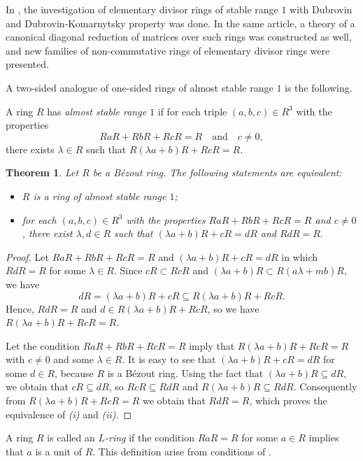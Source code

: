 \documentclass[12pt,a4paper, reqno]{amsart}
\newtheorem{theorem}{Theorem}
\begin{document}
In \cite{Bovdi_Zabavsky_2}, the investigation of elementary divisor rings of stable range $1$ with Dubrovin and
Dubrovin-Komarnytsky property was done.
In the same article, a theory of a canonical diagonal reduction of matrices over such rings was  constructed as well,  and new families of non-commutative rings of elementary divisor rings  were  presented.



A two-sided analogue of one-sided rings of almost stable range $1$ is the following.

A  ring $R$ has {\it almost stable range $1$} if for each triple $(a,b,c)\in R^3$ with the properties
\[
RaR+RbR+RcR=R \quad \text{and}\quad c\ne 0,
\]
there exists $\lambda\in R$ such that $R(\lambda a+b)R+RcR=R$.


\begin{theorem}\label{T:8}
Let $R$ be a B\'ezout ring. The following statements are equivalent:
\begin{itemize}
\item[(i)]$R$ is a ring of almost stable range $1$;
\item[(ii)] for each $(a,b,c)\in R^3$ with the properties   $RaR+RbR+RcR=R$ and  $c\ne0$, there exist $\lambda,d\in R$ such that
$(\lambda a + b)R + cR = dR$ and $RdR = R$.
\end{itemize}
\end{theorem}

\begin{proof}
Let $RaR+RbR+RcR=R$ and $(\lambda a +b)R+cR=dR$ in which  $RdR=R$ for some $\lambda\in R$.
Since $cR\subset RcR$ and $(\lambda a +b)R\subset R(a\lambda +mb)R$, we have
\[
dR=(\lambda a+b)R+cR\subseteq R(\lambda a+b)R+RcR.
\]
Hence, $RdR=R$ and $d\in R(\lambda a +b)R+RcR$, so  we have $R(\lambda a +b)R+RcR=R$.

Let the condition $RaR+RbR+RcR=R$ imply  that $R(\lambda a +b)R+RcR=R$ with  $c\ne0$  and  some $\lambda\in R$. It is easy to see that $(\lambda a +b)R+cR=dR$ for some $d\in R$,  because $R$ is a B\'ezout ring. Using the fact that  $(\lambda a +b)R\subseteq dR$, we obtain that $cR\subseteq dR$, so  $RcR\subseteq RdR$ and $R(\lambda a +b)R\subseteq RdR$. Consequently  from  $R(\lambda a +b)R+RcR=R$ we obtain that $RdR=R$, which
proves the equivalence of \textsl{(i)} and \textsl{(ii)}.
\end{proof}

A ring $R$ is called an {\it $L$-ring}      if the condition $RaR=R$ for some  $a\in R$ implies that  $a$ is a unit of $R$. This definition arise from   conditions of \cite[Proposition 7.3(2)]{19-lamdugas}.
\end{document}
